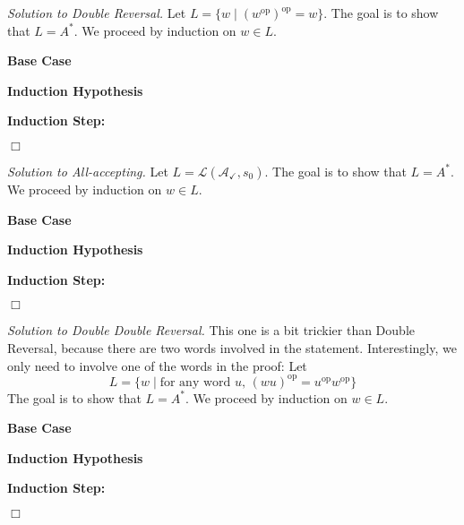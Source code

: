 \documentclass[11pt]{article}
\theoremstyle{theorem} %
\theoremstyle{definition} %
\theoremstyle{remark} %
\newcommand{\op}{\mathrm{op}}               %
\newcommand{\Lang}{\mathcal{L}}             %
\begin{document}
\pagebreak

\noindent\emph{Solution to Double Reversal.}
    Let \(L = \{w \mid (w^\op)^\op = w\}\).
    The goal is to show that \(L = A^*\).
    We proceed by induction on \(w \in L\).
    \bigskip

    \noindent\textbf{Base Case}
    
    \vspace*{5em}

    \noindent\textbf{Induction Hypothesis}

    \vspace*{10em}

    \noindent\textbf{Induction Step:}
    
\vfill\hfill\(\Box\)


\pagebreak

\noindent\emph{Solution to All-accepting.}
    Let \(L = \Lang(\mathcal A_{\checkmark}, s_0)\).
    The goal is to show that \(L = A^*\).
    We proceed by induction on \(w \in L\).
    \bigskip

    \noindent\textbf{Base Case}
    
    \vspace*{5em}

    \noindent\textbf{Induction Hypothesis}

    \vspace*{10em}

    \noindent\textbf{Induction Step:}
    
\vfill\hfill\(\Box\)

\pagebreak

\noindent\emph{Solution to Double Double Reversal.}
    This one is a bit trickier than Double Reversal, because there are two words involved in the statement. 
    Interestingly, we only need to involve one of the words in the proof:
    Let \[
        L = \{w \mid \text{for any word \(u\), \((wu)^\op = u^\op w^\op\)}\}
    \]
    The goal is to show that \(L = A^*\).
    We proceed by induction on \(w \in L\).
    \bigskip

    \noindent\textbf{Base Case}
    
    \vspace*{5em}

    \noindent\textbf{Induction Hypothesis}

    \vspace*{10em}

    \noindent\textbf{Induction Step:}
    
\vfill\hfill\(\Box\)
\end{document}
